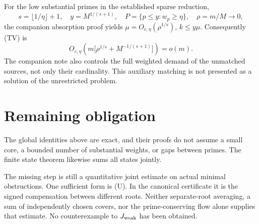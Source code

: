 \documentclass[11pt,a4paper]{article}
\begin{document}
For the low substantial primes in the established sparse reduction,
\[
 s=\lfloor1/\eta\rfloor+1,\quad
 y=M^{1/(s+1)},\quad
 P=\{p\le y:w_p\ge\eta\},\quad \rho=m/M\to0,
\]
the companion absorption proof yields
\(\mu=O_{c,\eta}(\rho^{1/s})\), \(k\le y\mu\).
Consequently (TV) is
\[
 O_{c,\eta}\!\left(m\bigl[\rho^{1/s}+M^{-1/(s+1)}\bigr]\right)
 =o(m).
\]
The companion note also controls the full weighted demand of the
unmatched sources, not only their cardinality. This auxiliary
matching is not presented as a solution of the unrestricted problem.

\section{Remaining obligation}
The global identities above are exact, and their proofs do not
assume a small core, a bounded number of substantial weights, or
gaps between primes. The finite state theorem likewise sums all
states jointly.

The missing step is still a quantitative joint estimate on actual
minimal obstructions. One sufficient form is (U). In the canonical
certificate it is the signed compensation between different roots.
Neither separate-root averaging, a sum of independently chosen
covers, nor the prime-conserving flow alone supplies that estimate.
No counterexample to \(J_{\rm weak}\) has been obtained.
\end{document}
